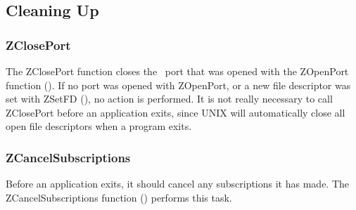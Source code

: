 %
\subsection{Cleaning Up}
\label{cleaning-up}

\subsubsection{ZClosePort}
\label{ZClosePort}

\etemplate
{}

The ZClosePort function closes the \Zephyr\ port that was opened with
the ZOpenPort function ().  If no port was opened
with ZOpenPort, or a new file descriptor was set with ZSetFD
(), no action is performed.  It is not really necessary
to call ZClosePort before an application exits, since UNIX will
automatically close all open file descriptors when a program exits.

\subsubsection{ZCancelSubscriptions}
\label{ZCancelSubscriptions-pt1}

Before an application exits, it should cancel any subscriptions
it has made.  The ZCancelSubscriptions function
() performs this task.
